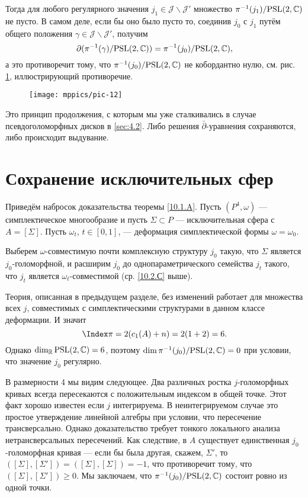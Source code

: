 Тогда для любого регулярного значения $j_1 \in \mathcal{J} \backslash \mathcal{J}'$ множество $\pi^{-1} (j_1)/\mathrm{PSL}(2, \mathbb{C})$ не пусто.
В самом деле, если бы оно было пусто то, соединив $j_0$ с $j_1$ путём общего положения $\gamma \in \mathcal{J} \backslash\mathcal{J}'$, получим
\[\partial(\pi^{-1}(\gamma)/\mathrm{PSL}(2,\mathbb{C}))
=
\pi^{-1}(j_0)/\mathrm{PSL}(2,\mathbb{C}),
\]
а это противоречит тому, что $\pi^{-1} (j_0)/\mathrm{PSL}(2, \mathbb{C})$ не кобордантно нулю, см. рис. \ref{pic-12}, иллюстрирующий противоречие.

\begin{figure}[ht!]
\vskip0mm
\centering
\texttt{[image: mppics/pic-12]}
\caption{}\label{pic-12}
\vskip0mm
\end{figure}

Это  принцип продолжения, с которым мы уже сталкивались в случае псевдоголоморфных дисков в \ref{sec:4.2}.
Либо решения $\bar\partial$-уравнения сохраняются, либо происходит выдувание.

\section{Сохранение исключительных сфер}

Приведём набросок доказательства теоремы \ref{10.1.A}.
Пусть $(P^4, \omega)$ --- симплектическое многообразие и пусть $\Sigma \subset P$ --- исключительная сфера с $A = [\Sigma]$.
Пусть $\omega_t$, $t \in [0, 1]$, --- деформация симплектической формы $\omega = \omega_0$.

Выберем $\omega$-совместимую почти комплексную структуру $j_0$ такую, что $\Sigma$ является $j_0$-голоморфной, и расширим $j_0$ до однопараметрического семейства $j_t$ такого, что $j_t$ является $\omega_t$-совместимой (ср. \ref{10.2.С} выше).

Теория, описанная в предыдущем разделе, без изменений работает для множества всех $j$, совместимых с симплектическими структурами в данном классе деформации.
И значит
\[\Index\pi = 2(c_1 (A) + n) = 2(1 + 2) = 6.\]
Однако $\dim_{\mathbb{R}}\mathrm{PSL}(2, \mathbb{C}) = 6$, поэтому $\dim \pi^{-1} (j_0)/\mathrm{PSL}(2, \mathbb{C}) = 0$ при условии, что значение $j_0$ регулярно.

В размерности 4 мы видим следующее.
Два различных ростка $j$-голоморфных кривых всегда пересекаются с положительным индексом в общей точке.
Этот факт хорошо известен если $j$ интегрируема.
В неинтегрируемом случае это простое утверждение линейной алгебры при условии, что пересечение трансверсально.
Однако доказательство требует тонкого локального анализа нетрансверсальных пересечений.
Как следствие, в $A$ существует единственная $j_0$-голоморфная кривая --- если бы была другая, скажем, $\Sigma'$, то $([\Sigma], [\Sigma']) = ([\Sigma], [\Sigma]) = -1$, что противоречит тому, что $([\Sigma], [\Sigma']) \ge 0$.
Мы заключаем, что $\pi^{-1} (j_0)/\mathrm{PSL}(2, \mathbb{C})$ состоит ровно из одной точки.


